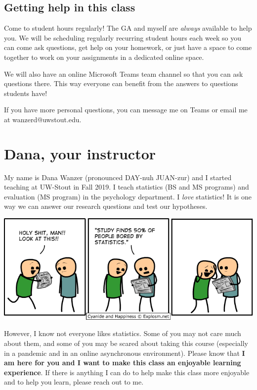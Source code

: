\documentclass[
]{book}
\begin{document}
\hypertarget{getting-help-in-this-class}{%
\subsection{Getting help in this class}\label{getting-help-in-this-class}}

Come to student hours regularly! The GA and myself are \emph{always} available to help you. We will be scheduling regularly recurring student hours each week so you can come ask questions, get help on your homework, or just have a space to come together to work on your assignments in a dedicated online space.

We will also have an online Microsoft Teams team channel so that you can ask questions there. This way everyone can benefit from the answers to questions students have!

If you have more personal questions, you can message me on Teams or email me at wanzerd@uwstout.edu.

\hypertarget{dana-your-instructor}{%
\section{Dana, your instructor}\label{dana-your-instructor}}

My name is Dana Wanzer (pronounced DAY-nuh JUAN-zur) and I started teaching at UW-Stout in Fall 2019. I teach statistics (BS and MS programs) and evaluation (MS program) in the psychology department. I \emph{love} statistics! It is one way we can answer our research questions and test our hypotheses.

\includegraphics{images/01-intro/cyanide-happiness_statistics.png}

However, I know not everyone likes statistics. Some of you may not care much about them, and some of you may be scared about taking this course (especially in a pandemic and in an online asynchronous environment). Please know that \textbf{I am here for you and I want to make this class an enjoyable learning experience}. If there is anything I can do to help make this class more enjoyable and to help you learn, please reach out to me.
\end{document}
